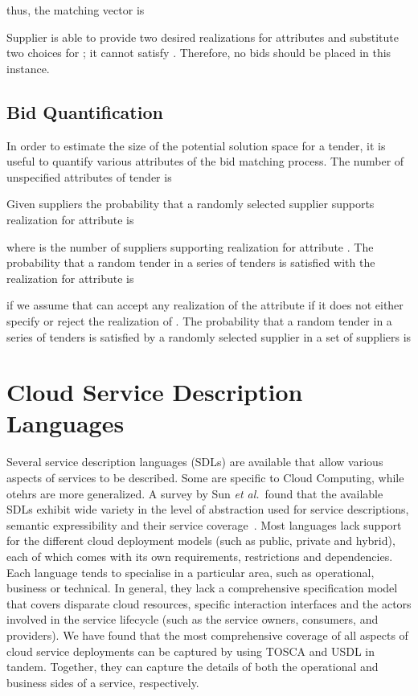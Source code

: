\documentclass[10pt, conference, compsocconf]{IEEEtran}
\begin{document}
thus, the matching vector is

Supplier  is able to provide two desired realizations for attributes  and substitute two choices for ; it cannot satisfy . Therefore, no bids should be placed in this instance.


\subsection{Bid Quantification}

In order to estimate the size of the potential solution space for a tender, it is useful to quantify various attributes of the bid matching process. The number of unspecified attributes of tender  is

\noindent Given  suppliers the probability that a randomly selected supplier  supports realization  for attribute  is

where  is the number of suppliers supporting realization  for attribute . The probability that a random tender   in a series of  tenders is satisfied with the realization  for attribute  is

if we assume that  can accept  any realization of the attribute  if it does not either specify or reject the realization  of . The probability that a random tender  in a series of  tenders is satisfied by a randomly selected supplier  in a set of  suppliers is





\section{Cloud Service Description Languages}
\label{sec:service-description-languages}


Several service description languages (SDLs) are available that allow various aspects of services to be described. Some are specific to Cloud Computing, while otehrs are more generalized. A survey by Sun \textit{et al.}~found that the available SDLs exhibit wide variety in the level of abstraction used for service descriptions, semantic expressibility and their service coverage~\cite{sun_survey_2012}. Most languages lack support for the different cloud deployment models (such as public, private and hybrid), each of which comes with its own requirements, restrictions and dependencies. Each language tends to specialise in a particular area, such as operational, business or technical. In general, they lack a comprehensive specification model that covers disparate cloud resources, specific interaction interfaces and the actors involved in the service lifecycle (such as the service owners, consumers, and providers). We have found that the most comprehensive coverage of all aspects of cloud service deployments can be captured by using TOSCA and USDL in tandem. Together, they can capture the details of both the operational and business sides of a service, respectively.
\end{document}
